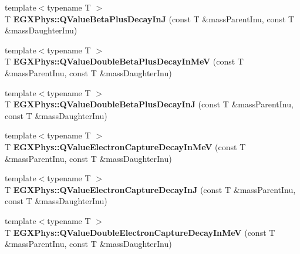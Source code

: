 \begin{DoxyCompactItemize}
\item 
\mbox{\label{group___e_g_x_phys-_q_value_ga066fe9a9816a204c801c557a85bc60df}} 
{\footnotesize template$<$typename T $>$ }\\T {\bfseries E\+G\+X\+Phys\+::\+Q\+Value\+Beta\+Plus\+Decay\+InJ} (const T \&mass\+Parent\+Inu, const T \&mass\+Daughter\+Inu)
\item 
\mbox{\label{group___e_g_x_phys-_q_value_ga3fb4b374bc1df69b96a66d0488bb2ba1}} 
{\footnotesize template$<$typename T $>$ }\\T {\bfseries E\+G\+X\+Phys\+::\+Q\+Value\+Double\+Beta\+Plus\+Decay\+In\+MeV} (const T \&mass\+Parent\+Inu, const T \&mass\+Daughter\+Inu)
\item 
\mbox{\label{group___e_g_x_phys-_q_value_ga7d8dcc2691c2d4de9132e758e149ba51}} 
{\footnotesize template$<$typename T $>$ }\\T {\bfseries E\+G\+X\+Phys\+::\+Q\+Value\+Double\+Beta\+Plus\+Decay\+InJ} (const T \&mass\+Parent\+Inu, const T \&mass\+Daughter\+Inu)
\item 
\mbox{\label{group___e_g_x_phys-_q_value_ga9a6b76207e2ec60fd0ee3511582f9e26}} 
{\footnotesize template$<$typename T $>$ }\\T {\bfseries E\+G\+X\+Phys\+::\+Q\+Value\+Electron\+Capture\+Decay\+In\+MeV} (const T \&mass\+Parent\+Inu, const T \&mass\+Daughter\+Inu)
\item 
\mbox{\label{group___e_g_x_phys-_q_value_ga7b523a7d197beb91dcda75ddde12c851}} 
{\footnotesize template$<$typename T $>$ }\\T {\bfseries E\+G\+X\+Phys\+::\+Q\+Value\+Electron\+Capture\+Decay\+InJ} (const T \&mass\+Parent\+Inu, const T \&mass\+Daughter\+Inu)
\item 
\mbox{\label{group___e_g_x_phys-_q_value_ga93e5774784c0d9551e46ba19e1dbc9ab}} 
{\footnotesize template$<$typename T $>$ }\\T {\bfseries E\+G\+X\+Phys\+::\+Q\+Value\+Double\+Electron\+Capture\+Decay\+In\+MeV} (const T \&mass\+Parent\+Inu, const T \&mass\+Daughter\+Inu)
\item 
\mbox{\label{group___e_g_x_phys-_q_value_gae25e179b76580bc6af7fa4bdf938ba4e}} 

\end{DoxyCompactItemize}
